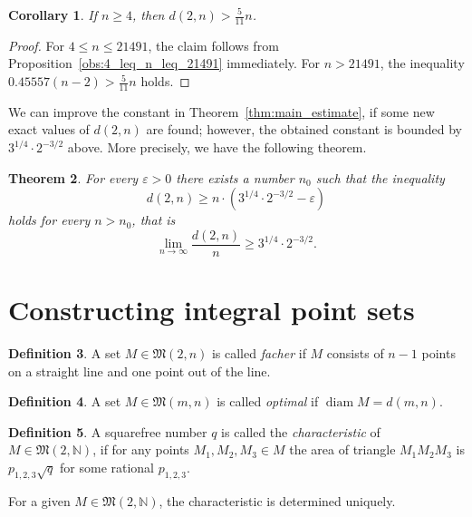 \documentclass[a4paper,14pt]{article} %
\theoremstyle{plain}
\newtheorem{theorem}{Theorem}[section]
\newtheorem{corollary}[theorem]{Corollary}
\theoremstyle{definition}
\newtheorem{definition}[theorem]{Definition}
\begin{document}
\begin{corollary}
	If $n\geq 4$, then $d(2,n) > \frac{5}{11} n$.
\end{corollary}

\begin{proof}
	For $4 \leq n \leq 21491$, the claim follows from Proposition~\ref{obs:4_leq_n_leq_21491} immediately.
	For $n > 21491$, the inequality $0.45557(n-2) > \frac{5}{11}n$ holds.
\end{proof}


We can improve the constant in Theorem~\ref{thm:main_estimate},
if some new exact values of $d(2,n)$ are found;
however, the obtained constant is bounded by $3^{1/4}\cdot2^{-3/2}$ above.
More precisely, we have the following theorem.

\begin{theorem}
	For every $\varepsilon > 0$ there exists a number $n_0$ such that the inequality
	\begin{equation}
		d(2,n) \geq n\cdot(3^{1/4}\cdot 2^{-3/2} - \varepsilon)
	\end{equation}
	holds for every $n>n_0$,
	that is
	\begin{equation}
		\lim_{n\to\infty} \frac{d(2,n)}{n} \geq 3^{1/4}\cdot 2^{-3/2}
		.
	\end{equation}
\end{theorem}



\section{Constructing integral point sets}

\begin{definition}
	A set $M\in\mathfrak{M}(2,n)$ is called \textit{facher}
	if $M$ consists of $n-1$ points on a straight line
	and one point out of the line.
\end{definition}

\begin{definition}
	A set $M\in\mathfrak{M}(m,n)$ is called \textit{optimal}
	if $\operatorname{diam}M=d(m,n)$.
\end{definition}

\begin{definition}
	\cite{kurz2005characteristic}
	A squarefree number $q$ is called the \textit{characteristic} of $M\in\mathfrak{M}(2,\mathbb{N})$,
	if for any points $M_1, M_2, M_3 \in M$ the area of triangle $M_1 M_2 M_3$
	is $p_{1,2,3}\sqrt{q}$ for some rational $p_{1,2,3}$.
\end{definition}
For a given $M\in\mathfrak{M}(2,\mathbb{N})$, the characteristic is determined uniquely.
\end{document}

